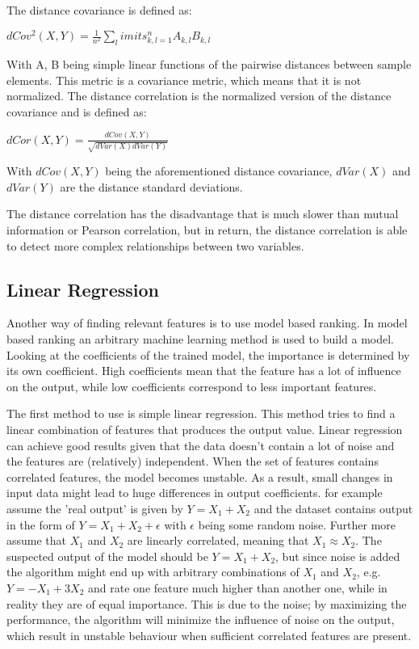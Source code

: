\npar

The distance covariance is defined as\citep{distPaper}:
\begin{center}
$dCov^2(X,Y) = \frac{1}{n^2}\sum_limits_{k,l=1}^{n} A_{k,l}B_{k,l}$
\end{center}
With A, B being simple linear functions of the pairwise distances between sample elements. This metric is a covariance metric, which means that it is not normalized. The distance correlation is the normalized version of the distance covariance and is defined as:

\begin{center}
$dCor(X,Y) = \frac{dCov(X,Y)}{\sqrt{dVar(X)dVar(Y)}}$
\end{center}
With $dCov(X,Y)$ being the aforementioned distance covariance, $dVar(X)$ and $dVar(Y)$ are the distance standard deviations. 

\npar

The distance correlation has the disadvantage that is much slower than mutual information or Pearson correlation, but in return, the distance correlation is able to detect more complex relationships between two variables.

\subsection{Linear Regression}
Another way of finding relevant features is to use model based ranking. In model based ranking an arbitrary machine learning method is used to build a model. Looking at the coefficients of the trained model, the importance is determined by its own coefficient. High coefficients mean that the feature has a lot of influence on the output, while low coefficients correspond to less important features.

\npar

The first method to use is simple linear regression. This method tries to find a linear combination of features that produces the output value. Linear regression can achieve good results given that the data doesn't contain a lot of noise and the features are (relatively) independent. When the set of features contains correlated features, the model becomes unstable. As a result, small changes in input data might lead to huge differences in output coefficients. for example assume the 'real output' is given by $Y = X_1 + X_2$ and the dataset contains output in the form of $Y = X_1 + X_2 + \epsilon$ with $\epsilon$ being some random noise. Further more assume that $X_1$ and $X_2$ are linearly correlated, meaning that $X_1 \approx X_2$. The suspected output of the model should be $Y = X_1 + X_2$, but since noise is added the algorithm might end up with arbitrary combinations of $X_1$ and $X_2$, e.g. $Y = -X_1 + 3X_2$ and rate one feature much higher than another one, while in reality they are of equal importance. This is due to the noise; by maximizing the performance, the algorithm will minimize the influence of noise on the output, which result in unstable behaviour when sufficient correlated features are present. 

